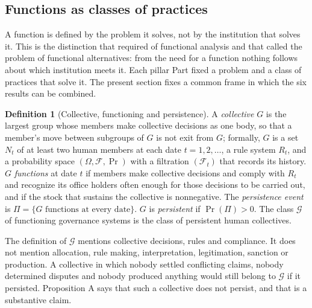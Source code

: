 \documentclass[11pt,letterpaper]{article}
\theoremstyle{definition}
\newtheorem{definition}[theorem]{Definition}
\theoremstyle{remark}
\begin{document}
\subsection{Functions as classes of practices}

A function is defined by the problem it solves, not by the institution that solves it. This is the distinction that \citet{hempel1959} required of functional analysis and that \citet{merton1968} called the problem of functional alternatives: from the need for a function nothing follows about which institution meets it. Each pillar Part fixed a problem and a class of practices that solve it. The present section fixes a common frame in which the six results can be combined.

\begin{definition}[Collective, functioning and persistence]
\label{def:formalized-state:collective}
A \emph{collective} $G$ is the largest group whose members make collective decisions as one body, so that a member's move between subgroups of $G$ is not exit from $G$; formally, $G$ is a set $N_t$ of at least two human members at each date $t=1,2,\dots$, a rule system $R_t$, and a probability space $(\Omega,\mathcal{F},\Pr)$ with a filtration $(\mathcal{F}_t)$ that records its history. $G$ \emph{functions} at date $t$ if members make collective decisions and comply with $R_t$ and recognize its office holders often enough for those decisions to be carried out, and if the stock that sustains the collective is nonnegative. The \emph{persistence event} is $\Pi=\{G\text{ functions at every date}\}$. $G$ is \emph{persistent} if $\Pr(\Pi)>0$. The class $\mathcal{G}$ of functioning governance systems is the class of persistent human collectives.
\end{definition}

The definition of $\mathcal{G}$ mentions collective decisions, rules and compliance. It does not mention allocation, rule making, interpretation, legitimation, sanction or production. A collective in which nobody settled conflicting claims, nobody determined disputes and nobody produced anything would still belong to $\mathcal{G}$ if it persisted. Proposition A says that such a collective does not persist, and that is a substantive claim.
\end{document}
